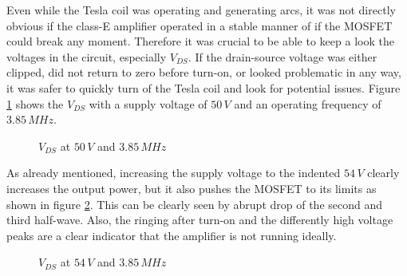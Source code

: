 Even while the Tesla coil was operating and generating arcs, it was not directly obvious if the class-E amplifier operated in a stable manner of if the MOSFET could break any moment. Therefore it was crucial to be able to keep a look the voltages in the circuit, especially \(V_{DS}\). If the drain-source voltage was either clipped, did not return to zero before turn-on, or looked problematic in any way, it was safer to quickly turn of the Tesla coil and look for potential issues. Figure \ref{fig:vds-50} shows the \(V_{DS}\) with a supply voltage of \(50\,V\) and an operating frequency of \(3.85\,MHz\).

\begin{figure}[h!]
    \centering
    \caption{\(V_{DS}\) at \(50\,V\) and \(3.85\,MHz\)}
    \label{fig:vds-50}
\end{figure}

As already mentioned, increasing the supply voltage to the indented \(54\,V\) clearly increases the output power, but it also pushes the MOSFET to its limits as shown in figure \ref{fig:vds-54}. This can be clearly seen by abrupt drop of the second and third half-wave. Also, the ringing after turn-on and the differently high voltage peaks are a clear indicator that the amplifier is not running ideally.

\begin{figure}[h!]
    \centering
    \caption{\(V_{DS}\) at \(54\,V\) and \(3.85\,MHz\)}
    \label{fig:vds-54}
\end{figure}


